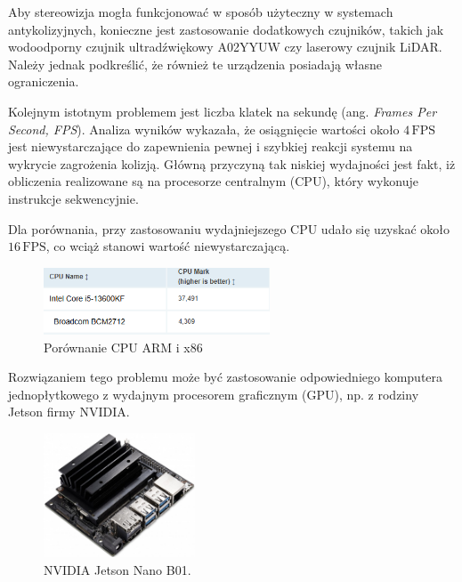 \documentclass[magisterska]{pracadypl}
\begin{document}
Aby stereowizja mogła funkcjonować w sposób użyteczny w systemach antykolizyjnych, konieczne jest zastosowanie dodatkowych czujników, takich jak wodoodporny czujnik ultradźwiękowy A02YYUW czy laserowy czujnik LiDAR. Należy jednak podkreślić, że również te urządzenia posiadają własne ograniczenia.

Kolejnym istotnym problemem jest liczba klatek na sekundę (ang. \textit{Frames Per Second, FPS}). Analiza wyników wykazała, że osiągnięcie wartości około $4\,\text{FPS}$ jest niewystarczające do zapewnienia pewnej i szybkiej reakcji systemu na wykrycie zagrożenia kolizją. Główną przyczyną tak niskiej wydajności jest fakt, iż obliczenia realizowane są na procesorze centralnym (CPU), który wykonuje instrukcje sekwencyjnie.

Dla porównania, przy zastosowaniu wydajniejszego CPU udało się uzyskać około $16\,\text{FPS}$, co wciąż stanowi wartość niewystarczającą.

\begin{figure}[H]  %
    \centering  %
    \includegraphics[width=0.6\textwidth]{images/cpu-compare.png}  %
    \captionsetup{font=footnotesize}
    \caption[Porównanie CPU ARM i x86. https://www.cpubenchmark.net/]{Porównanie CPU ARM i x86}
\end{figure}

Rozwiązaniem tego problemu może być zastosowanie odpowiedniego komputera jednopłytkowego z wydajnym procesorem graficznym (GPU), np. z rodziny Jetson firmy NVIDIA.

\begin{figure}[H]  %
    \centering  %
    \includegraphics[width=0.4\textwidth]{images/jetson.png}  %
    \captionsetup{font=footnotesize}
    \caption[NVIDIA Jetson Nano B01. https://kamami.pl/wycofane-z-oferty/574587-zestaw-deweloperski-nvidia-jetson-nano.html]{NVIDIA Jetson Nano B01.}
\end{figure}
\end{document}
